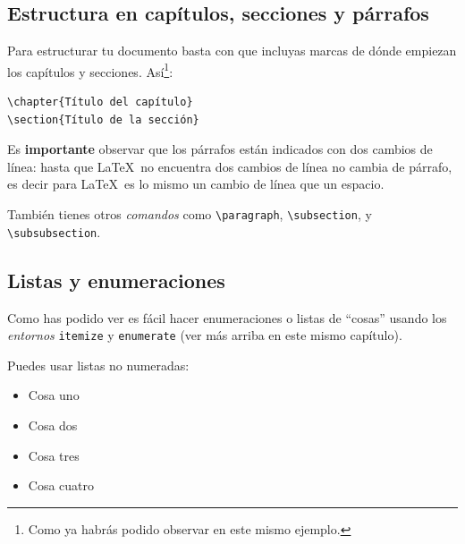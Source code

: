 \subsection{Estructura en capítulos, secciones y párrafos}

Para estructurar tu documento basta con que incluyas marcas de dónde
empiezan los capítulos y secciones. Así\footnote{Como ya habrás podido
  observar en este mismo ejemplo.}:

\begin{verbatim}
\chapter{Título del capítulo}
\section{Título de la sección}
\end{verbatim}

Es \textbf{importante} observar que los párrafos están indicados con
dos cambios de línea: hasta que \LaTeX\ no encuentra dos cambios de
línea no cambia de párrafo, es decir para \LaTeX\ es lo mismo un
cambio de línea que un espacio.

También tienes otros \emph{comandos} como \verb|\paragraph|,
\verb|\subsection|, y \verb|\subsubsection|.

\subsection{Listas y enumeraciones}

Como has podido ver es fácil hacer enumeraciones o listas de ``cosas''
usando los \emph{entornos} \verb|itemize| y \verb|enumerate| (ver
más arriba en este mismo capítulo).

Puedes usar listas no numeradas:
\begin{itemize}
\item Cosa uno
\item Cosa dos
\item Cosa tres
\item Cosa cuatro
\end{itemize}

